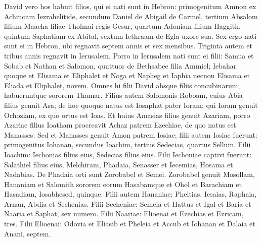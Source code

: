 \begin{biblechapter}
\begin{biblechapter}
\begin{biblechapter}
\verse David vero hos habuit filios, qui ei nati sunt in Hebron: primogenitum Amnon ex Achinoam Iezrahelitide, secundum Daniel de Abigail de Carmel, 
\verse tertium Absalom filium Maacha filiae Tholmai regis Gesur, quartum Adoniam filium Haggith, 
\verse quintum Saphatiam ex Abital, sextum Iethraam de Egla uxore sua. 
 \verse Sex ergo nati sunt ei in Hebron, ubi regnavit septem annis et sex mensibus. Triginta autem et tribus annis regnavit in Ierusalem. 
\verse Porro in Ierusalem nati sunt ei filii: Samua et Sobab et Nathan et Salomon, quattuor de Bethsabee filia Ammiel; 
\verse Iebahar quoque et Elisama et Eliphalet 
\verse et Noga et Napheg et Iaphia 
 \verse necnon Elisama et Eliada et Eliphalet, novem.
 \verse Omnes hi filii David absque filiis concubinarum; habueruntque sororem Thamar.
 \verse Filius autem Salomonis Roboam, cuius Abia filius genuit Asa; de hoc quoque natus est Iosaphat 
\verse pater Ioram; qui Ioram genuit Ochoziam, ex quo ortus est Ioas. 
\verse Et huius Amasias filius genuit Azariam, porro Azariae filius Ioatham 
\verse procreavit Achaz patrem Ezechiae, de quo natus est Manasses. 
 \verse Sed et Manasses genuit Amon patrem Iosiae; 
\verse filii autem Iosiae fuerunt: primogenitus Iohanan, secundus Ioachim, tertius Sedecias, quartus Sellum. 
\verse Filii Ioachim: Iechonias filius eius, Sedecias filius eius. 
\verse Filii Iechoniae captivi fuerunt: Salathiel filius eius, 
\verse Melchiram, Phadaia, Senasser et Iecemias, Hosama et Nadabias. 
\verse De Phadaia orti sunt Zorobabel et Semei. Zorobabel genuit Mosollam, Hananiam et Salomith sororem eorum 
\verse Hasabamque et Ohol et Barachiam et Hasadiam, Iosabhesed, quinque. 
\verse Filii autem Hananiae: Pheltias, Iesaias, Raphaia, Arnan, Abdia et Sechenias. 
\verse Filii Secheniae: Semeia et Hattus et Igal et Baria et Naaria et Saphat, sex numero. 
\verse Filii Naariae: Elioenai et Ezechias et Ezricam, tres. 
\verse Filii Elioenai: Odovia et Eliasib et Pheleia et Accub et Iohanan et Dalaia et Anani, septem.
 

\end{biblechapter}
\end{biblechapter}
\end{biblechapter}
